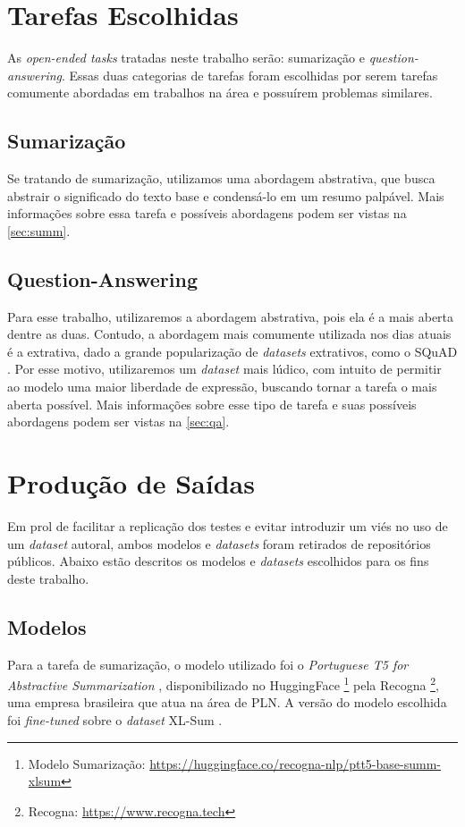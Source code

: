 \documentclass[cic,tc]{iiufrgs}
\begin{document}
\section{Tarefas Escolhidas}
As \textit{open-ended tasks} tratadas neste trabalho serão: sumarização e \textit{question-answering}. Essas duas categorias de tarefas foram escolhidas por serem tarefas comumente abordadas em trabalhos na área e possuírem problemas similares.

\subsection{Sumarização}
Se tratando de sumarização, utilizamos uma abordagem abstrativa, que busca abstrair o significado do texto base e condensá-lo em um resumo palpável. Mais informações sobre essa tarefa e possíveis abordagens podem ser vistas na \autoref{sec:summ}.

\subsection{Question-Answering}
Para esse trabalho, utilizaremos a abordagem abstrativa, pois ela é a mais aberta dentre as duas. 
Contudo, a abordagem mais comumente utilizada nos dias atuais é a extrativa, dado a grande popularização de \textit{datasets} extrativos, como o SQuAD \cite{rajpurkar2016squad}. Por esse motivo, utilizaremos um \textit{dataset} mais lúdico, com intuito de permitir ao modelo uma maior liberdade de expressão, buscando tornar a tarefa o mais aberta possível. Mais informações sobre esse tipo de tarefa e suas possíveis abordagens podem ser vistas na \autoref{sec:qa}.

\section{Produção de Saídas}
\label{sec:modelos e datasets}
Em prol de facilitar a replicação dos testes e evitar introduzir um viés no uso de um \textit{dataset} autoral, ambos modelos e \textit{datasets} foram retirados de repositórios públicos. Abaixo estão descritos os modelos e \textit{datasets} escolhidos para os fins deste trabalho.

\subsection{Modelos}
\label{sec:modelos}
Para a tarefa de sumarização, o modelo utilizado foi o \textit{Portuguese T5 for Abstractive Summarization} \cite{ptt5summ_bracis}, disponibilizado no HuggingFace \footnote{Modelo Sumarização: \url{https://huggingface.co/recogna-nlp/ptt5-base-summ-xlsum}} pela Recogna \footnote{Recogna: \url{https://www.recogna.tech}}, uma empresa brasileira que atua na área de PLN. A versão do modelo escolhida foi \textit{fine-tuned} sobre o \textit{dataset} XL-Sum \cite{hasan2021xl}.
\end{document}
